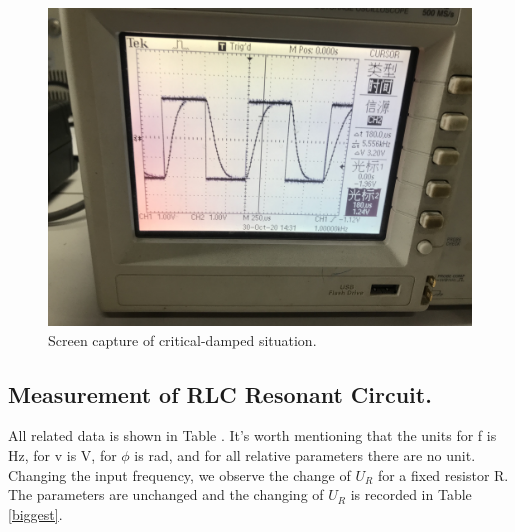 \documentclass[12pt,a4paper]{article}
\begin{document}
\begin{figure}[H]
    \centering
    \includegraphics[scale=0.085]{critical.jpeg}
    \caption{ Screen capture of critical-damped situation.}
    \label{ Screen capture of critical-damped situation.}
\end{figure}
\subsection{Measurement of RLC Resonant Circuit.}
\qquad All related data is shown in Table . It's worth mentioning that the units for f is Hz, for v is V, for $\phi$ is rad, and for all relative parameters there are no unit. Changing the input frequency, we observe the change of $U_R$ for a fixed resistor R. The parameters are unchanged and the changing of $U_R$ is recorded in Table \ref{biggest}.
\end{document}

